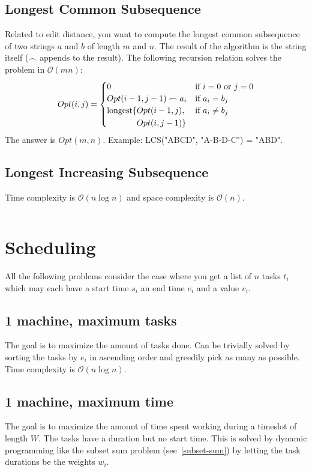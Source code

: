 \documentclass[8pt,a4paper,landscape,oneside]{amsart}
\newcommand{\code}[1]{\inputminted[fontsize=\normalsize,baselinestretch=1]{java}{code/#1}}
\newcommand{\bigO}{\mathcal{O}}
\begin{document}
\begin{multicols*}{3}
  \subsection{Longest Common Subsequence}
  Related to edit distance, you want to compute the longest common subsequence of two strings $a$ and $b$ of length $m$ and $n$. The result of the algorithm is the string itself ($\frown$ appends to the result). The following recursion relation solves the problem in $\bigO(mn)$:
  \[
  Opt(i,j) = \begin{cases}
  0 & \text{if } i=0 \text{ or } j=0 \\
  Opt(i-1,j-1) \frown a_i & \text{if } a_i=b_j \\
  \begin{aligned}[t]\arraycolsep=0pt
    \mathrm{longest}\lbrace &
      Opt(i-1,j), \\ & 
      Opt(i,j-1) \rbrace
  \end{aligned} & \text{if } a_i\neq b_j
  \end{cases}
  \]
  The answer is $Opt(m,n)$. Example: LCS("ABCD", "A-B-D-C") = "ABD".
  
  \subsection{Longest Increasing Subsequence}
  Time complexity is $\bigO(n\log n)$ and space complexity is $\bigO(n)$.
  \code{DP/LongestIncreasingSubsequence.java}
  
  
\section{Scheduling}
All the following problems consider the case where you get a list of $n$ tasks $t_i$ which may each have a start time $s_i$ an end time $e_i$ and a value $v_i$.
  \subsection{1 machine, maximum tasks}
  The goal is to maximize the amount of tasks done. Can be trivially solved by sorting the tasks by $e_i$ in ascending order and greedily pick as many as possible. Time complexity is $\bigO(n\log n)$.
  
  \subsection{1 machine, maximum time}
  The goal is to maximize the amount of time spent working during a timeslot of length $W$. The tasks have a duration but no start time. This is solved by dynamic programming like the subset sum problem (see~\ref{subset-sum}) by letting the task durations be the weights $w_i$.
  

\end{multicols*}
\end{document}
